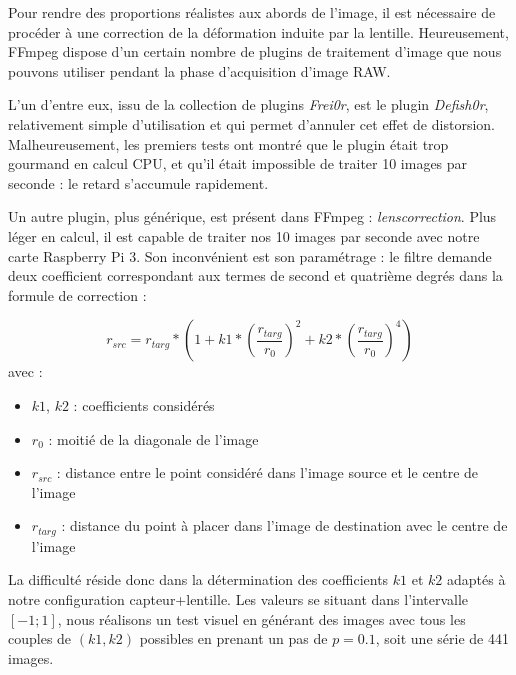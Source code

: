 \documentclass[11pt,a4paper]{article}
\begin{document}
Pour rendre des proportions réalistes aux abords de l'image, il est nécessaire de procéder à une correction de la déformation induite par la lentille.
Heureusement, FFmpeg dispose d'un certain nombre de plugins de traitement d'image que nous pouvons utiliser pendant la phase d'acquisition d'image RAW.

\bigbreak
L'un d'entre eux, issu de la collection de plugins \textit{Frei0r}, est le plugin \textit{Defish0r}, relativement simple d'utilisation et qui permet d'annuler cet effet de distorsion.
Malheureusement, les premiers tests ont montré que le plugin était trop gourmand en calcul CPU, et qu'il était impossible de traiter 10 images par seconde : le retard s'accumule rapidement.

\bigbreak
Un autre plugin, plus générique, est présent dans FFmpeg : \textit{lenscorrection}.
Plus léger en calcul, il est capable de traiter nos 10 images par seconde avec notre carte Raspberry Pi 3.
Son inconvénient est son paramétrage : le filtre demande deux coefficient correspondant aux termes de second et quatrième degrés dans la formule de correction :

$$r_{src} = r_{targ} * (1 + k1*(\frac{r_{targ}}{r_0})^2 + k2*(\frac{r_{targ}}{r_0})^4)$$
avec :
\begin{itemize}
\item{$k1$, $k2$ : coefficients considérés}
\item{$r_0$ : moitié de la diagonale de l'image}
\item{$r_{src}$ : distance entre le point considéré dans l'image source et le centre de l'image}
\item{$r_{targ}$ : distance du point à placer dans l'image de destination avec le centre de l'image}
\end{itemize}

\bigbreak

La difficulté réside donc dans la détermination des coefficients $k1$ et $k2$ adaptés à notre configuration capteur+lentille.
Les valeurs se situant dans l'intervalle $[-1;1]$, nous réalisons un test visuel en générant des images avec tous les couples de $(k1, k2)$ possibles en prenant un pas de $p=0.1$, soit une série de 441 images.
\end{document}
